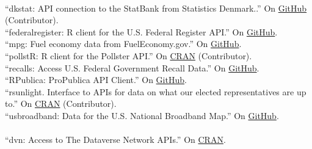 \documentclass[12pt]{article}
\newcommand{\topic}[1]{\pagebreak[3]\indent {\color{lg}{\footnotesize #1 }}\\}
\newcommand{\entry}[1]{\indent {\color{lg}\guillemotright}\hspace{2pt}#1\vspace{.25em}\\}
\begin{document}
\topic{R packages contributed to rOpenGov}
\entry{``dkstat: API connection to the StatBank from Statistics Denmark..'' On \href{https://github.com/rOpenGov/dkstat}{GitHub} (Contributor).}
\entry{``federalregister: R client for the U.S. Federal Register API.'' On \href{https://github.com/rOpenGov/federalregister}{GitHub}.}
\entry{``mpg: Fuel economy data from FuelEconomy.gov.'' On \href{https://github.com/rOpenGov/mpg}{GitHub}.}
\entry{``pollstR: R client for the Pollster API.'' On \href{http://cran.r-project.org/web/packages/pollstR/index.html}{CRAN} (Contributor).}
\entry{``recalls: Access U.S. Federal Government Recall Data.'' On \href{https://github.com/rOpenGov/recalls}{GitHub}.}
\entry{``RPublica: ProPublica API Client.'' On \href{https://github.com/rOpenGov/RPublica}{GitHub}.}
\entry{``rsunlight. Interface to APIs for data on what our elected representatives are up to.'' On \href{http://cran.r-project.org/web/packages/rsunlight/index.html}{CRAN} (Contributor).}
\entry{``usbroadband: Data for the U.S. National Broadband Map.'' On \href{https://github.com/rOpenGov/usbroadband}{GitHub}.}

\topic{R packages contributed to rOpenSci}
\entry{``dvn: Access to The Dataverse Network APIs.'' On \href{http://cran.r-project.org/web/packages/dvn/index.html}{CRAN}.}
\end{document}
